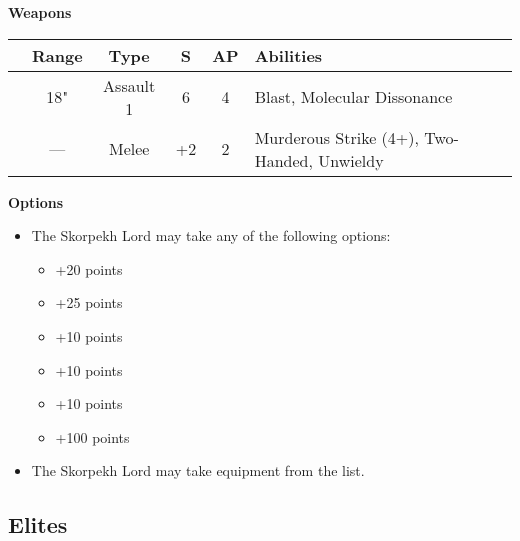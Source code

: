 \begin{minipage}[t]{0.72\textwidth}
	\vspace*{2em}
	\textbf{Weapons}
	
	\begin{tabular}{m{95 pt} *{4}{c} >{\raggedright\arraybackslash}p{130pt}}
		& Range & Type & S & AP & Abilities \\
		\hline
		\quickref{Enmitic Annihilator} & 18" & Assault 1 & 6 & 4 & Blast, Molecular Dissonance \\
		\quickref{Hyperphase Harvester} & — & Melee & +2 & 2 & Murderous Strike (4+), Two-Handed, Unwieldy \\
	\end{tabular}
	
	\vspace*{2em}
	\textbf{Options}
	\begin{itemize}
		\item The Skorpekh Lord may take any of the following options:
		\begin{itemize}
			\item {} \dotfill +20 points
			\item {} \dotfill +25 points
			\item {} \dotfill +10 points
			\item {} \dotfill +10 points
			\item {} \dotfill +10 points
			\item {} \dotfill +100 points
		\end{itemize}
		\item The Skorpekh Lord may take equipment from the  list.
	\end{itemize}
\end{minipage}
\hspace{0.5em}


\newpage
\subsection{Elites}

\newpage
